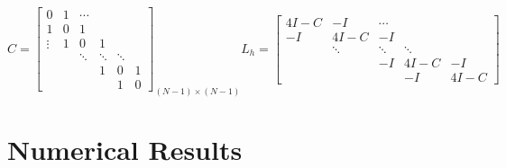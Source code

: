 \documentclass[a4paper,11pt]{article}
\begin{document}
\begin{equation}    
    C=
        \begin{bmatrix}
            0 & 1 & \cdots \\
            1 & 0 & 1 \\
            \vdots  & 1 & 0 & 1 \\
              &  &\ddots & \ddots & \ddots \\
              &  &  & 1 & 0 & 1 \\
              &  &  &   & 1 & 0
        \end{bmatrix}_{(N-1)\times (N-1)}
    L_{h}=
        \begin{bmatrix}
            4I-C & -I & \cdots \\
            -I & 4I-C & -I \\
            &\ddots & \ddots & \ddots \\
            &  & -I & 4I-C & -I \\
            &  &   & -I & 4I-C
        \end{bmatrix}    
\end{equation}

\section{Numerical Results}
\end{document}
